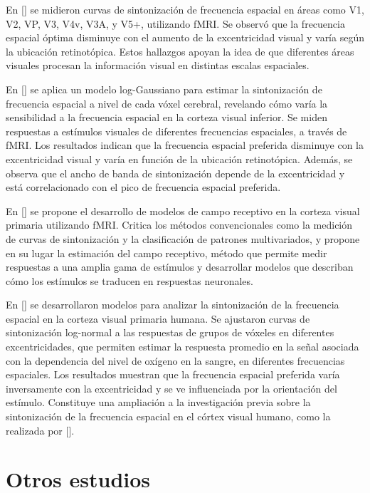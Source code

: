 En [\cite{henriksson_spatial_2008}] se midieron curvas de sintonización de frecuencia espacial en áreas como V1, V2, VP, V3, V4v, V3A, y V5+, utilizando fMRI. Se observó que la frecuencia espacial óptima disminuye con el aumento de la excentricidad visual y varía según la ubicación retinotópica. Estos hallazgos apoyan la idea de que diferentes áreas visuales procesan la información visual en distintas escalas espaciales.

En [\cite{aghajari_population_2020}] se aplica un modelo log-Gaussiano para estimar la sintonización de frecuencia espacial a nivel de cada vóxel cerebral, revelando cómo varía la sensibilidad a la frecuencia espacial en la corteza visual inferior. Se miden respuestas a estímulos visuales de diferentes frecuencias espaciales, a través de fMRI. Los resultados indican que la frecuencia espacial preferida disminuye con la excentricidad visual y varía en función de la ubicación retinotópica. Además, se observa que el ancho de banda de sintonización depende de la excentricidad y está correlacionado con el pico de frecuencia espacial preferida.

En [\cite{kriegeskorte_understanding_2011}] se propone el desarrollo de modelos de campo receptivo en la corteza visual primaria utilizando fMRI. Critica los métodos convencionales como la medición de curvas de sintonización y la clasificación de patrones multivariados, y propone en su lugar la estimación del campo receptivo, método que permite medir respuestas a una amplia gama de estímulos y desarrollar modelos que describan cómo los estímulos se traducen en respuestas neuronales.

En [\cite{broderick_mapping_2022}] se desarrollaron modelos para analizar la sintonización de la frecuencia espacial en la corteza visual primaria humana. Se ajustaron curvas de sintonización log-normal a las respuestas de grupos de vóxeles en diferentes excentricidades, que permiten estimar la respuesta promedio en la señal asociada con la dependencia del nivel de oxígeno en la sangre, en diferentes frecuencias espaciales. Los resultados muestran que la frecuencia espacial preferida varía inversamente con la excentricidad y se ve influenciada por la orientación del estímulo. Constituye una ampliación a la investigación previa sobre la sintonización de la frecuencia espacial en el córtex visual humano, como la realizada por [\cite{aghajari_population_2020}].

\section{Otros estudios}

